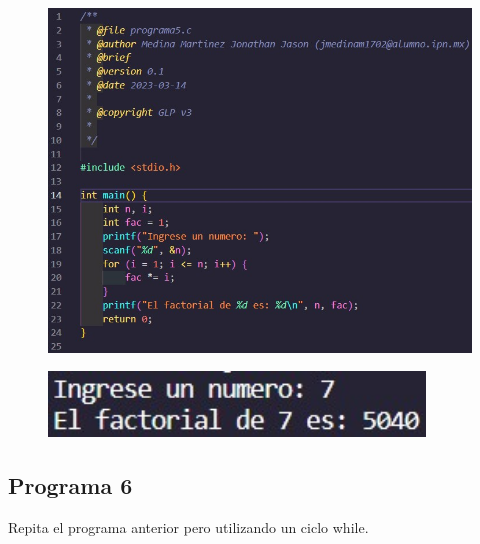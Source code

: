 \documentclass{article}
\begin{document}
\begin{figure}[H]
    \centering
    \includegraphics[width = 15cm]{img5a.jpg}
\end{figure}
\begin{figure}[H]
    \centering
    \includegraphics[width = 10cm]{img5b.jpg}
\end{figure}
\newpage
\subsection{Programa 6}

Repita el programa anterior pero utilizando un ciclo while.
\end{document}
